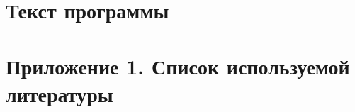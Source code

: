 \documentclass[
encoding=utf8
]{./twoeskd}
\begin{document}

% 

\newpage
{}
\tableofcontents

\newpage
\section{Текст программы}


\newpage
\section{Приложение 1. Список используемой литературы}


\newpage
\eskdListOfChanges

\end{document}

